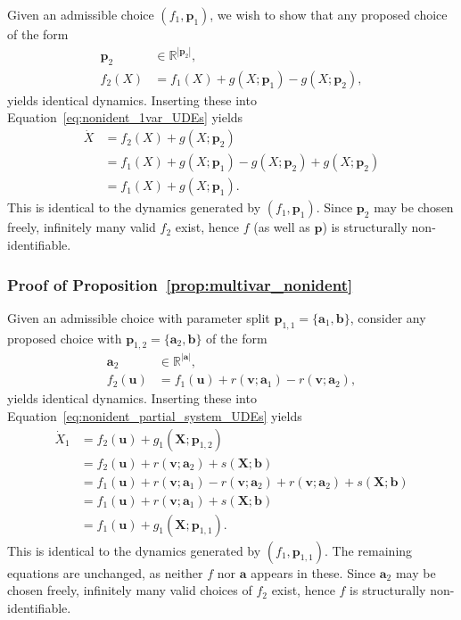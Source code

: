 \documentclass{article}
\theoremstyle{plain}
\theoremstyle{definition}
\renewcommand{\vec}[1]{\boldsymbol{#1}}
\begin{document}
{Given an admissible choice $(f_1,\vec{p}_1)$, we wish to show that any proposed choice of the form
\begin{align*}    
    \vec{p}_2 &\in \mathbb{R}^{|\vec{p}_2|}, \\
    f_2(X) &= f_1(X) + g(X;\vec{p}_1) - g(X;\vec{p}_2),
\end{align*}
yields identical dynamics. Inserting these into Equation~\eqref{eq:nonident_1var_UDEs} yields
\begin{align*}
    \dot{X} &= f_2(X) + g(X;\vec{p}_2) \\
            &= f_1(X) + g(X;\vec{p}_1) - g(X;\vec{p}_2) + g(X;\vec{p}_2) \\
            &= f_1(X) + g(X;\vec{p}_1).
\end{align*}
This is identical to the dynamics generated by $(f_1,\vec{p}_1)$. Since $\vec{p}_2$ may be chosen freely, infinitely many valid $f_2$ exist, hence $f$ (as well as $\vec{p}$) is structurally non-identifiable.

\subsubsection{Proof of Proposition~\ref{prop:multivar_nonident}} \label{appendix:proof_multivar}

Given an admissible choice with parameter split $\vec{p}_{1,1}=\{\vec{a}_1,\vec{b}\}$, consider any proposed choice with $\vec{p}_{1,2}=\{\vec{a}_2,\vec{b}\}$ of the form
\begin{align*}
    \vec{a}_2    &\in \mathbb{R}^{|\vec{a}|}, \\
    f_2(\vec{u}) &= f_1(\vec{u}) + r(\vec{v};\vec{a}_1) - r(\vec{v};\vec{a}_2),
\end{align*}
yields identical dynamics. Inserting these into Equation~\eqref{eq:nonident_partial_system_UDEs} yields
\begin{align*}
    \dot{X}_1 &= f_2(\vec{u}) + g_1(\vec{X};\vec{p}_{1,2}) \\
              &= f_2(\vec{u}) + r(\vec{v};\vec{a}_2) + s(\vec{X};\vec{b}) \\
              &= f_1(\vec{u}) + r(\vec{v};\vec{a}_1) - r(\vec{v};\vec{a}_2) + r(\vec{v};\vec{a}_2) + s(\vec{X};\vec{b}) \\
              &= f_1(\vec{u}) + r(\vec{v};\vec{a}_1) + s(\vec{X};\vec{b}) \\
              &= f_1(\vec{u}) + g_1(\vec{X};\vec{p}_{1,1}).
\end{align*}
This is identical to the dynamics generated by $(f_1, \vec{p}_{1,1})$. The remaining equations are unchanged, as neither $f$ nor $\vec{a}$ appears in these. Since $\vec{a}_2$ may be chosen freely, infinitely many valid choices of $f_2$ exist, hence $f$ is structurally non-identifiable.

}
\end{document}
